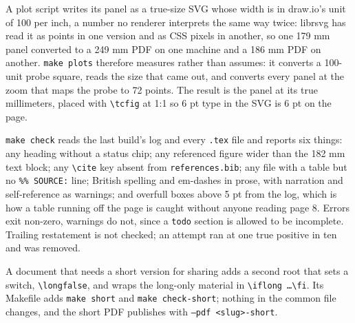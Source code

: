 A plot script writes its panel as a true-size SVG whose width is in draw.io's unit
of 100 per inch, a number no renderer interprets the same way twice: librsvg has
read it as points in one version and as CSS pixels in another, so one 179 mm panel
converted to a 249 mm PDF on one machine and a 186 mm PDF on another. \texttt{make
plots} therefore measures rather than assumes: it converts a 100-unit probe square,
reads the size that came out, and converts every panel at the zoom that maps the
probe to 72 points. The result is the panel at its true millimeters, placed with
\texttt{\textbackslash tcfig} at 1:1 so 6 pt type in the SVG is 6 pt on the page.

\texttt{make check} reads the last build's log and every \texttt{.tex} file and
reports six things: any heading without a status chip; any referenced figure wider
than the 182 mm text block; any \texttt{\textbackslash cite} key absent from
\texttt{references.bib}; any file with a table but no \texttt{\%\% SOURCE:} line;
British spelling and em-dashes in prose, with narration and self-reference as
warnings; and overfull boxes above 5 pt from the log, which is how a table running
off the page is caught without anyone reading page 8. Errors exit non-zero,
warnings do not, since a \texttt{todo} section is allowed to be incomplete.
Trailing restatement is not checked; an attempt ran at one true positive in ten and
was removed.

A document that needs a short version for sharing adds a second root that sets a
switch, \texttt{\textbackslash longfalse}, and wraps the long-only material in
\texttt{\textbackslash iflong \ldots \textbackslash fi}. Its Makefile adds
\texttt{make short} and \texttt{make check-short}; nothing in the common file
changes, and the short PDF publishes with \texttt{--pdf <slug>-short}.
